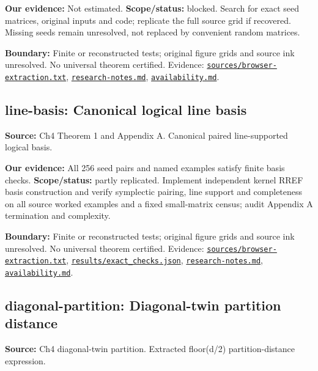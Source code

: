 \documentclass[11pt]{article}
\begin{document}
\textbf{Our evidence:} Not estimated. \textbf{Scope/status:} blocked. Search for exact seed matrices, original inputs and code; replicate the full source grid if recovered. Missing seeds remain unresolved, not replaced by convenient random matrices.

\textbf{Boundary:} Finite or reconstructed tests; original figure grids and source ink unresolved. No universal theorem certified. Evidence: \href{https://github.com/alectionary/vibe-math/blob/master/formalization/quintavalle-hgp/sources/browser-extraction.txt}{\nolinkurl{sources/browser-extraction.txt}}, \href{https://github.com/alectionary/vibe-math/blob/master/formalization/quintavalle-hgp/research-notes.md}{\nolinkurl{research-notes.md}}, \href{https://github.com/alectionary/vibe-math/blob/master/formalization/quintavalle-hgp/availability.md}{\nolinkurl{availability.md}}.
\subsection{line-basis: Canonical logical line basis}
\label{claim:line-basis}
\textbf{Source:} Ch4 Theorem 1 and Appendix A. Canonical paired line-supported logical basis.

\textbf{Our evidence:} All 256 seed pairs and named examples satisfy finite basis checks. \textbf{Scope/status:} partly replicated. Implement independent kernel RREF basis construction and verify symplectic pairing, line support and completeness on all source worked examples and a fixed small-matrix census; audit Appendix A termination and complexity.

\textbf{Boundary:} Finite or reconstructed tests; original figure grids and source ink unresolved. No universal theorem certified. Evidence: \href{https://github.com/alectionary/vibe-math/blob/master/formalization/quintavalle-hgp/sources/browser-extraction.txt}{\nolinkurl{sources/browser-extraction.txt}}, \href{https://github.com/alectionary/vibe-math/blob/master/formalization/quintavalle-hgp/results/exact_checks.json}{\nolinkurl{results/exact_checks.json}}, \href{https://github.com/alectionary/vibe-math/blob/master/formalization/quintavalle-hgp/research-notes.md}{\nolinkurl{research-notes.md}}, \href{https://github.com/alectionary/vibe-math/blob/master/formalization/quintavalle-hgp/availability.md}{\nolinkurl{availability.md}}.
\subsection{diagonal-partition: Diagonal-twin partition distance}
\label{claim:diagonal-partition}
\textbf{Source:} Ch4 diagonal-twin partition. Extracted floor(d/2) partition-distance expression.
\end{document}
